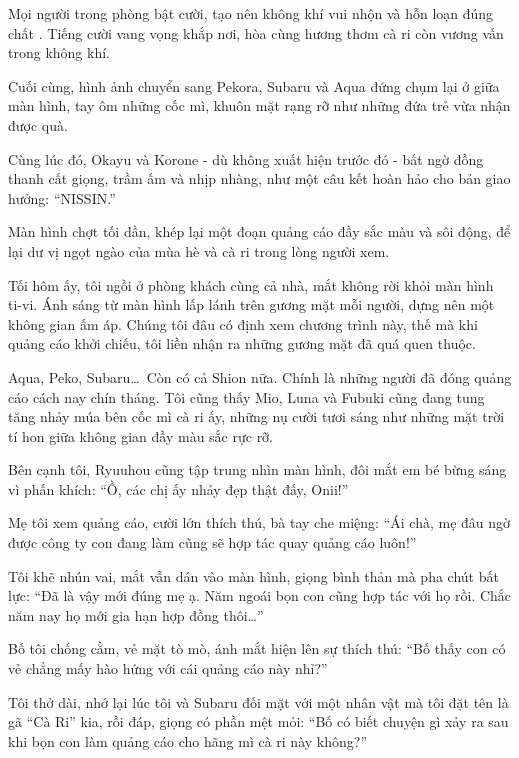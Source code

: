 \documentclass[../main.tex]{subfiles}
\begin{document}
Mọi người trong phòng bật cười, tạo nên không khí vui nhộn và hỗn loạn đúng chất \hll. Tiếng cười vang vọng khắp nơi, hòa cùng hương thơm cà ri còn vương vấn trong không khí.

Cuối cùng, hình ảnh chuyển sang Pekora, Subaru và Aqua đứng chụm lại ở giữa màn hình, tay ôm những cốc mì, khuôn mặt rạng rỡ như những đứa trẻ vừa nhận được quà.


Cùng lúc đó, Okayu và Korone - dù không xuất hiện trước đó - bất ngờ đồng thanh cất giọng, trầm ấm và nhịp nhàng, như một câu kết hoàn hảo cho bản giao hưởng: ``NISSIN.''

Màn hình chợt tối dần, khép lại một đoạn quảng cáo đầy sắc màu và sôi động, để lại dư vị ngọt ngào của mùa hè và cà ri trong lòng người xem.

\omk


Tối hôm ấy, tôi ngồi ở phòng khách cùng cả nhà, mắt không rời khỏi màn hình ti-vi. Ánh sáng từ màn hình lấp lánh trên gương mặt mỗi người, dựng nên một không gian ấm áp. Chúng tôi đâu có định xem chương trình này, thế mà khi quảng cáo khởi chiếu, tôi liền nhận ra những gương mặt đã quá quen thuộc.

Aqua, Peko, Subaru\dots\ Còn có cả Shion nữa. Chính là những người đã đóng quảng cáo cách nay chín tháng. Tôi cũng thấy Mio, Luna và Fubuki cũng đang tung tăng nhảy múa bên cốc mì cà ri ấy, những nụ cười tươi sáng như những mặt trời tí hon giữa không gian đầy màu sắc rực rỡ.

Bên cạnh tôi, Ryuuhou cũng tập trung nhìn màn hình, đôi mắt em bé bừng sáng vì phấn khích: ``Ồ, các chị ấy nhảy đẹp thật đấy, Onii!''

Mẹ tôi xem quảng cáo, cười lớn thích thú, bà tay che miệng: ``Ái chà, mẹ đâu ngờ được công ty con đang làm cũng sẽ hợp tác quay quảng cáo luôn!''

Tôi khẽ nhún vai, mắt vẫn dán vào màn hình, giọng bình thản mà pha chút bất lực: ``Đã là vậy mới đúng mẹ ạ. Năm ngoái bọn con cũng hợp tác với họ rồi. Chắc năm nay họ mới gia hạn hợp đồng thôi\dots''

Bố tôi chống cằm, vẻ mặt tò mò, ánh mắt hiện lên sự thích thú: ``Bố thấy con có vẻ chẳng mấy hào hứng với cái quảng cáo này nhỉ?''

Tôi thở dài, nhớ lại lúc tôi và Subaru đối mặt với một nhân vật mà tôi đặt tên là gã ``Cà Ri'' kia, rồi đáp, giọng có phần mệt mỏi: ``Bố có biết chuyện gì xảy ra sau khi bọn con làm quảng cáo cho hãng mì cà ri này không?''
\end{document}
